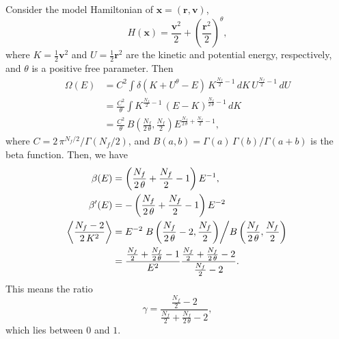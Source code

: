 \documentclass[reprint]{revtex4-1}
\begin{document}
Consider the model Hamiltonian of $\mathbf x = (\mathbf r, \mathbf v)$,
\begin{equation}
  H(\mathbf x)
  =
  \frac{\mathbf v^2} { 2 }
  +
  \left( \frac{\mathbf r^2} { 2 } \right)^\theta
  ,
\end{equation}
%
where $K = \frac 1 2 {\mathbf v}^2$ and
$U = \frac 1 2 {\mathbf r}^2$
are the kinetic and potential energy, respectively,
and $\theta$ is a positive free parameter.
Then
\begin{align*}
  \Omega(E)
  &=
  C^2
  \int
    \delta\left( K + U^\theta - E \right) \,
    K^{\frac{ N_f } 2 - 1} \, dK \, U^{\frac{ N_f } 2 - 1} \, dU
  \\
  &=
  \frac{ C^2 } { \theta }
  \int
  K^{\frac{ N_f } 2 - 1} \, (E - K)^{\frac{ N_f }{ 2 \, \theta } - 1}
    \, dK
  \\
  &=
  \frac{ C^2 }{ \theta } \,
  B\left( \frac{ N_f } {2 \, \theta}, \frac{ N_f } 2 \right)
  E^{ \frac{ N_f }{2 \, \theta} + \frac{N_f}{2} - 1 }
  ,
\end{align*}
where
%
$C = 2 \, \pi^{N_f/2} / \Gamma\left( N_f / 2 \right)$,
and
$B(a, b) = \Gamma(a) \, \Gamma(b) / \Gamma(a+b)$
is the beta function.
%
Then, we have
\begin{align*}
\beta(E)
&=
\left(
  \frac{ N_f } { 2 \, \theta } + \frac{ N_f } 2 - 1
\right)
E^{-1}
,
\\
\beta'(E)
&=
-
\left(
  \frac{ N_f } { 2 \, \theta } + \frac{ N_f } 2 - 1
\right)
E^{-2}
\\
\left\langle
  \frac{
    N_f - 2
  }
  {
    2 \, K^2
  }
\right\rangle
&=
  E^{-2}
\left.
  B\left( \frac{ N_f } { 2  \, \theta } - 2, \frac{ N_f } { 2 } \right)
\middle/
  B\left( \frac{ N_f } { 2  \, \theta }, \frac{ N_f } { 2 } \right)
\right.
\\
&=
\frac{ \frac{ N_f } 2 + \frac{ N_f }{2 \, \theta} - 1 }
     { E^2 }
\frac{ \frac{ N_f } 2 + \frac{ N_f }{2 \, \theta} - 2 }
     { \frac{ N_f } 2 - 2 }
.
\end{align*}
This means the ratio
$$
\gamma
=
\frac
{
  \frac{ N_f } 2 - 2
}
{
  \frac{ N_f } 2 + \frac{N_f}{2 \, \theta} - 2
}
,
$$
which lies between $0$ and $1$.

%

\end{document}
